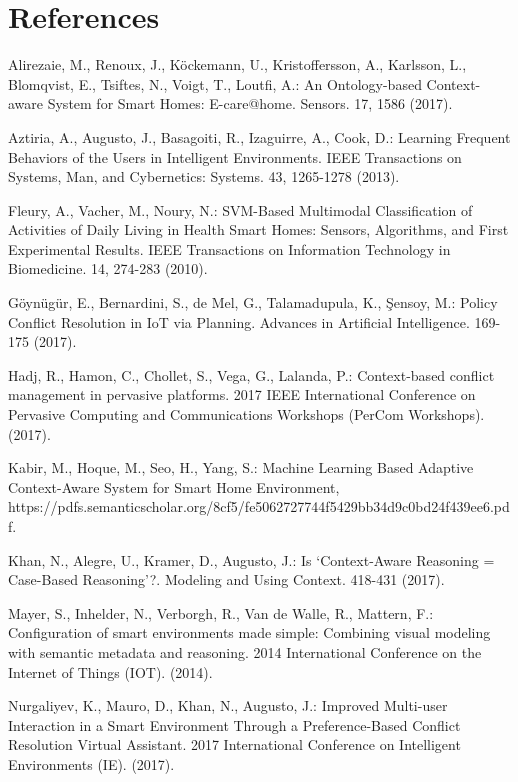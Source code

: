 \documentclass{llncs}
\begin{document}
    \section{References}
    \begin{thebibliography}{1}
        Alirezaie, M., Renoux, J., Köckemann, U., Kristoffersson, A., Karlsson, L., Blomqvist, E., Tsiftes, N., Voigt, T., Loutfi, A.: An Ontology-based Context-aware System for Smart Homes: E-care@home. Sensors. 17, 1586 (2017).

        Aztiria, A., Augusto, J., Basagoiti, R., Izaguirre, A., Cook, D.: Learning Frequent Behaviors of the Users in Intelligent Environments. IEEE Transactions on Systems, Man, and Cybernetics: Systems. 43, 1265-1278 (2013).

        Fleury, A., Vacher, M., Noury, N.: SVM-Based Multimodal Classification of Activities of Daily Living in Health Smart Homes: Sensors, Algorithms, and First Experimental Results. IEEE Transactions on Information Technology in Biomedicine. 14, 274-283 (2010).

        Göynügür, E., Bernardini, S., de Mel, G., Talamadupula, K., Şensoy, M.: Policy Conflict Resolution in IoT via Planning. Advances in Artificial Intelligence. 169-175 (2017).

        Hadj, R., Hamon, C., Chollet, S., Vega, G., Lalanda, P.: Context-based conflict management in pervasive platforms. 2017 IEEE International Conference on Pervasive Computing and Communications Workshops (PerCom Workshops). (2017).

        Kabir, M., Hoque, M., Seo, H., Yang, S.: Machine Learning Based Adaptive Context-Aware System for Smart Home Environment, https://pdfs.semanticscholar.org/8cf5/fe5062727744f5429bb34d9c0bd24f439ee6.pdf.

        Khan, N., Alegre, U., Kramer, D., Augusto, J.: Is ‘Context-Aware Reasoning = Case-Based Reasoning’?. Modeling and Using Context. 418-431 (2017).

        Mayer, S., Inhelder, N., Verborgh, R., Van de Walle, R., Mattern, F.: Configuration of smart environments made simple: Combining visual modeling with semantic metadata and reasoning. 2014 International Conference on the Internet of Things (IOT). (2014).

        Nurgaliyev, K., Mauro, D., Khan, N., Augusto, J.: Improved Multi-user Interaction in a Smart Environment Through a Preference-Based Conflict Resolution Virtual Assistant. 2017 International Conference on Intelligent Environments (IE). (2017).


\end{thebibliography}
\end{document}
